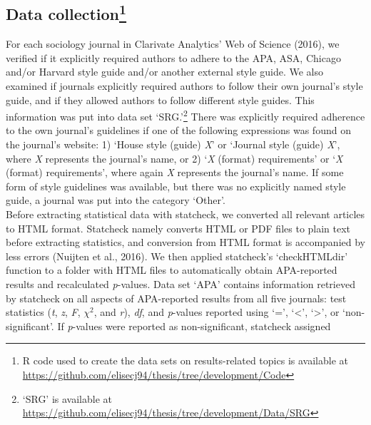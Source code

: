 \documentclass[
  12pt,
]{article}
\begin{document}
\hypertarget{data-collection}{%
\subsection[Data collection]{\texorpdfstring{Data collection\footnote{R
  code used to create the data sets on results-related topics is
  available at
  \url{https://github.com/elisecj94/thesis/tree/development/Code}}}{Data collection}}\label{data-collection}}

For each sociology journal in Clarivate Analytics' Web of Science
(2016), we verified if it explicitly required authors to adhere to the
APA, ASA, Chicago and/or Harvard style guide and/or another external
style guide. We also examined if journals explicitly required authors to
follow their own journal's style guide, and if they allowed authors to
follow different style guides. This information was put into data set
`SRG.'\footnote{`SRG' is available at
  \url{https://github.com/elisecj94/thesis/tree/development/Data/SRG}}
There was explicitly required adherence to the own journal's guidelines
if one of the following expressions was found on the journal's website:
1) `House style (guide) \emph{X}' or `Journal style (guide) \emph{X}',
where \emph{X} represents the journal's name, or 2) `\emph{X} (format)
requirements' or `\emph{X} (format) requirements', where again \emph{X}
represents the journal's name. If some form of style guidelines was
available, but there was no explicitly named style guide, a journal was
put into the category `Other'.\\
\hspace*{0.333em}\hspace*{0.333em}\hspace*{0.333em}\hspace*{0.333em}Before
extracting statistical data with statcheck, we converted all relevant
articles to HTML format. Statcheck namely converts HTML or PDF files to
plain text before extracting statistics, and conversion from HTML format
is accompanied by less errors (Nuijten et al., 2016). We then applied
statcheck's `checkHTMLdir' function to a folder with HTML files to
automatically obtain APA-reported results and recalculated
\emph{p}-values. Data set `APA' contains information retrieved by
statcheck on all aspects of APA-reported results from all five journals:
test statistics (\emph{t}, \emph{z}, \emph{F}, \(\chi^2\), and
\emph{r}), \emph{df}, and \emph{p}-values reported using `=',
`\textless{}', `\textgreater{}', or `non-significant'. If
\emph{p}-values were reported as non-significant, statcheck assigned
\end{document}
